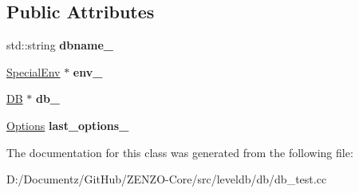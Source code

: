 \subsection*{Public Attributes}
\begin{DoxyCompactItemize}
\item 
\mbox{\label{classleveldb_1_1_d_b_test_ab7eb9815f522ad154816d72d1cc23a86}} 
std\+::string {\bfseries dbname\+\_\+}
\item 
\mbox{\label{classleveldb_1_1_d_b_test_ae6bb66675fe5419ed647efd1bfd332f8}} 
\mbox{\hyperlink{classleveldb_1_1_special_env}{Special\+Env}} $\ast$ {\bfseries env\+\_\+}
\item 
\mbox{\label{classleveldb_1_1_d_b_test_a2c3db8773f1aa15128432a87489b0d5a}} 
\mbox{\hyperlink{classleveldb_1_1_d_b}{DB}} $\ast$ {\bfseries db\+\_\+}
\item 
\mbox{\label{classleveldb_1_1_d_b_test_adc05df912917d8de411d0672af04330f}} 
\mbox{\hyperlink{structleveldb_1_1_options}{Options}} {\bfseries last\+\_\+options\+\_\+}
\end{DoxyCompactItemize}


The documentation for this class was generated from the following file\+:\begin{DoxyCompactItemize}
\item 
D\+:/\+Documentz/\+Git\+Hub/\+Z\+E\+N\+Z\+O-\/\+Core/src/leveldb/db/db\+\_\+test.\+cc\end{DoxyCompactItemize}
